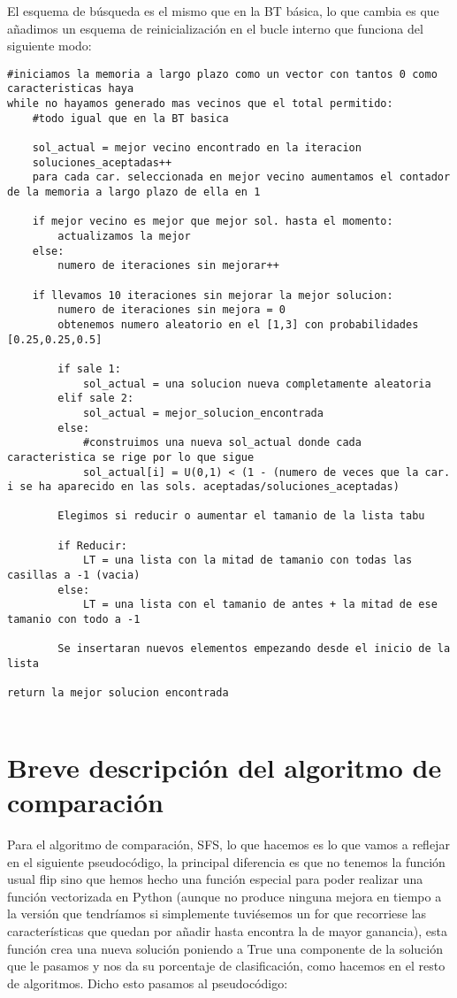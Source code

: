 \documentclass[10pt,a4paper]{article}
\begin{document}
El esquema de búsqueda es el mismo que en la BT básica, lo que cambia es que añadimos un esquema de reinicialización en el bucle interno que funciona del siguiente modo:\\

\begin{lstlisting}
#iniciamos la memoria a largo plazo como un vector con tantos 0 como caracteristicas haya
while no hayamos generado mas vecinos que el total permitido:
	#todo igual que en la BT basica
	
	sol_actual = mejor vecino encontrado en la iteracion
	soluciones_aceptadas++
	para cada car. seleccionada en mejor vecino aumentamos el contador de la memoria a largo plazo de ella en 1
	
	if mejor vecino es mejor que mejor sol. hasta el momento:
		actualizamos la mejor
	else:
		numero de iteraciones sin mejorar++
		
	if llevamos 10 iteraciones sin mejorar la mejor solucion:
		numero de iteraciones sin mejora = 0
		obtenemos numero aleatorio en el [1,3] con probabilidades [0.25,0.25,0.5]
		
		if sale 1:
			sol_actual = una solucion nueva completamente aleatoria
		elif sale 2:
			sol_actual = mejor_solucion_encontrada
		else:
			#construimos una nueva sol_actual donde cada caracteristica se rige por lo que sigue
			sol_actual[i] = U(0,1) < (1 - (numero de veces que la car. i se ha aparecido en las sols. aceptadas/soluciones_aceptadas)
			
		Elegimos si reducir o aumentar el tamanio de la lista tabu
		
		if Reducir:
			LT = una lista con la mitad de tamanio con todas las casillas a -1 (vacia)
		else:
			LT = una lista con el tamanio de antes + la mitad de ese tamanio con todo a -1
			
		Se insertaran nuevos elementos empezando desde el inicio de la lista
		
return la mejor solucion encontrada
		
\end{lstlisting}
\newpage
\section{\color[rgb]{0.0,0.0,0.21}Breve descripción del algoritmo de comparación}

Para el algoritmo de comparación, SFS, lo que hacemos es lo que vamos a reflejar en el siguiente pseudocódigo, la principal diferencia es que no tenemos la función usual flip sino que hemos hecho una función especial para poder realizar una función vectorizada en Python (aunque no produce ninguna mejora en tiempo a la versión que tendríamos si simplemente tuviésemos un for que recorriese las características que quedan por añadir hasta encontra la de mayor ganancia), esta función crea una nueva solución poniendo a True una componente de la solución que le pasamos y nos da su porcentaje de clasificación, como hacemos en el resto de algoritmos. Dicho esto pasamos al pseudocódigo:
\end{document}
